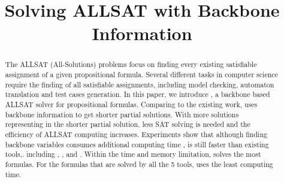 \documentclass{article}
\begin{document}
\title{Solving ALLSAT with Backbone Information}
\maketitle
\begin{abstract}
The ALLSAT (All-Solutions) problems focus on finding every existing satisfiable assignment of a given propositional formula. Several different tasks in computer science require the finding of all satisfiable assignments, including model checking, automaton translation and test cases generation.
In this paper, we introduce \tool, a backbone based ALLSAT solver for propositional formulas. Comparing to the existing work, \tool uses backbone information to get shorter partial solutions. With more solutions representing in the shorter partial solution, less SAT solving is needed and the efficiency of ALLSAT computing increases.
Experiments show that although finding backbone variables consumes additional computing time , \tool is still faster than existing tools,. including \ctool, \bc, \nbc and \bdd.
Within the time and memory limitation, \tool solves the most formulas.
For the formulas that are solved by all the 5 tools, \tool uses the least computing time.
\end{abstract}








\end{document}

